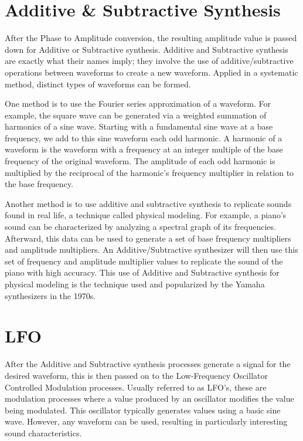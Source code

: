 \documentclass[a4paper,12pt]{report}
\begin{document}
\section{Additive \& Subtractive Synthesis}
After the Phase to Amplitude conversion, the resulting amplitude value is passed down for Additive or Subtractive synthesis. Additive and Subtractive synthesis are exactly what their names imply; they involve the use of additive/subtractive operations between waveforms to create a new waveform. Applied in a systematic method, distinct types of waveforms can be formed.

One method is to use the Fourier series approximation of a waveform. For example, the square wave can be generated via a weighted summation of harmonics of a sine wave. Starting with a fundamental sine wave at a base frequency, we add to this sine waveform each odd harmonic. A harmonic of a waveform is the waveform with a frequency at an integer multiple of the base frequency of the original waveform. The amplitude of each odd harmonic is multiplied by the reciprocal of the harmonic's frequency multiplier in relation to the base frequency.

Another method is to use additive and subtractive synthesis to replicate sounds found in real life, a technique called physical modeling. For example, a piano's sound can be characterized by analyzing a spectral graph of its frequencies. Afterward, this data can be used to generate a set of base frequency multipliers and amplitude multipliers. An Additive/Subtractive synthesizer will then use this set of frequency and amplitude multiplier values to replicate the sound of the piano with high accuracy. This use of Additive and Subtractive synthesis for physical modeling is the technique used and popularized by the Yamaha synthesizers in the 1970s.

\section{LFO}
After the Additive and Subtractive synthesis processes generate a signal for the desired waveform, this is then passed on to the Low-Frequency Oscillator Controlled Modulation processes. Usually referred to as LFO's, these are modulation processes where a value produced by an oscillator modifies the value being modulated. This oscillator typically generates values using a basic sine wave. However, any waveform can be used, resulting in particularly interesting sound characteristics.
\end{document}
